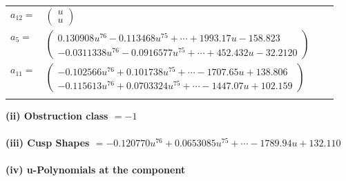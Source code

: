 \documentclass[1p]{elsarticle_modified}
\theoremstyle{definition}
\begin{document}
\begin{tabular}{m{7pt} m{180pt} m{7pt} m{180pt} }
\flushright $a_{12}=$&$\begin{pmatrix}u\\u\end{pmatrix}$ \\
\flushright $a_{5}=$&$\begin{pmatrix}0.130908 u^{76}-0.113468 u^{75}+\cdots+1993.17 u-158.823\\-0.0311338 u^{76}-0.0916577 u^{75}+\cdots+452.432 u-32.2120\end{pmatrix}$ \\
\flushright $a_{11}=$&$\begin{pmatrix}-0.102566 u^{76}+0.101738 u^{75}+\cdots-1707.65 u+138.806\\-0.115613 u^{76}+0.0703324 u^{75}+\cdots-1447.07 u+102.159\end{pmatrix}$\\&\end{tabular}
\flushleft \textbf{(ii) Obstruction class $= -1$}\\~\\
\flushleft \textbf{(iii) Cusp Shapes $= -0.120770 u^{76}+0.0653085 u^{75}+\cdots-1789.94 u+132.110$}\\~\\
\newpage\renewcommand{\arraystretch}{1}
\flushleft \textbf{(iv) u-Polynomials at the component}\newline \\
\end{document}
